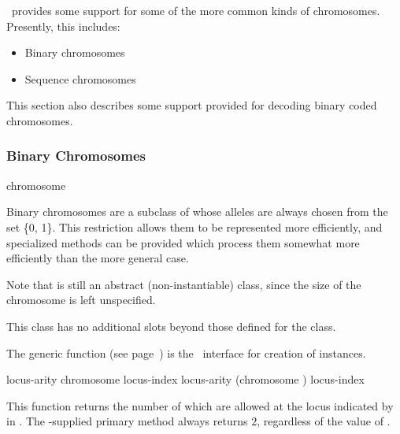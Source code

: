 {\Geco\ provides some support for some of the more common kinds of
chromosomes.  Presently, this includes:
\begin{itemize}
  \item Binary chromosomes
  \item Sequence chromosomes
\end{itemize}

This section also describes some support provided for decoding binary
coded chromosomes.

\filbreak
{\samepage
\subsubsection{Binary Chromosomes}

 {chromosome}

Binary chromosomes are a subclass of  whose alleles are always
chosen from the set \{0, 1\}. This restriction allows them to be represented
more efficiently, and specialized methods can be provided which process them
somewhat more efficiently than the more general case.
\par}%

\filbreak
Note that  is still an abstract (non-instantiable)
class, since the size of the chromosome is left unspecified.

\gap\filbreak

This class has no additional slots beyond those defined for the
 class.

\gap\filbreak
{\samepage


The generic function  (see
page~\pageref{method:make-chromosome}) is the \geco\ interface for creation
of  instances.
\par}%

\gap\filbreak
{\samepage


\Defgeneric locus-arity {chromosome locus-index}
 locus-arity {(chromosome ) locus-index}

This function returns the number of  which are allowed at
the locus indicated by  in .  The
\geco-supplied primary method always returns $2$, regardless of the
value of .
\par}%

}
